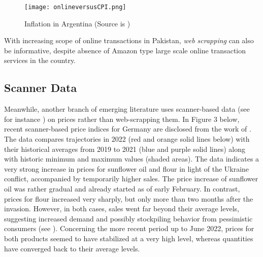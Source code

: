 \documentclass[12pt]{article}
\newcommand{\1}{\mathbbm 1}
\begin{document}
		
		
		
		
		
		
		
		
		
		
		
		
		
		
		
		
		
		
		
		\begin{figure}[H]
			\begin{Center}
				\texttt{[image: onlineversusCPI.png]}
				\caption{Inflation in Argentina (Source is \cite{cavallo2016billion})}
			\end{Center}
		\end{figure}
		
		
		With increasing scope of online transactions in Pakistan, \textit{web scrapping} can also be informative, despite absence of Amazon type large scale online transaction services in the country.
		
		\subsection{Scanner Data}
		
		
		
		Meanwhile, another branch of emerging literature uses scanner-based data (see for instance \cite{beck2020price}) on prices rather than web-scrapping them. In Figure 3 below, recent scanner-based price indices for Germany are disclosed from the work of \cite{beck2022}. The data compares trajectories in 2022 (red and orange solid lines below) with their historical averages from 2019 to 2021 (blue and purple solid lines) along with historic minimum and maximum values (shaded areas). The data indicates a very strong increase in prices for sunflower oil and flour in light of the Ukraine conflict, accompanied by temporarily higher sales. The price increase of sunflower oil was rather gradual and already started as of early February. In contrast, prices for flour increased very sharply, but only more than two months after the invasion. However, in both cases, sales went far beyond their average levels, suggesting increased demand and possibly stockpiling behavior from pessimistic consumers (see \cite{cavallo2021can}). Concerning the more recent period up to June 2022, prices for both products seemed to have stabilized at a very high level, whereas quantities have converged back to their average levels.
		
\end{document}
